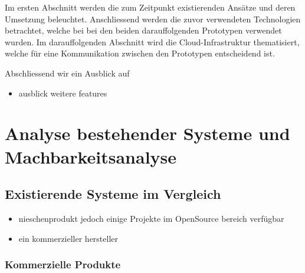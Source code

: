 Im ersten Abschnitt werden die zum Zeitpunkt existierenden Ansätze und
deren Umsetzung beleuchtet. Anschliessend werden die zuvor verwendeten
Technologien betrachtet, welche bei bei den beiden darauffolgenden
Prototypen verwendet wurden. Im darauffolgenden Abschnitt wird die
Cloud-Infrastruktur thematisiert, welche für eine Kommunikation zwischen
den Prototypen entscheidend ist.

Abschliessend wir ein Ausblick auf

\begin{itemize}
\tightlist
\item
  ausblick weitere features
\end{itemize}

\hypertarget{analyse-bestehender-systeme-und-machbarkeitsanalyse}{%
\section{Analyse bestehender Systeme und
Machbarkeitsanalyse}\label{analyse-bestehender-systeme-und-machbarkeitsanalyse}}

\hypertarget{existierende-systeme-im-vergleich}{%
\subsection{Existierende Systeme im
Vergleich}\label{existierende-systeme-im-vergleich}}

\begin{itemize}
\tightlist
\item
  nieschenprodukt jedoch einige Projekte im OpenSource bereich verfügbar
\item
  ein kommerzieller hersteller
\end{itemize}

\hypertarget{kommerzielle-produkte}{%
\subsubsection{Kommerzielle Produkte}\label{kommerzielle-produkte}}

